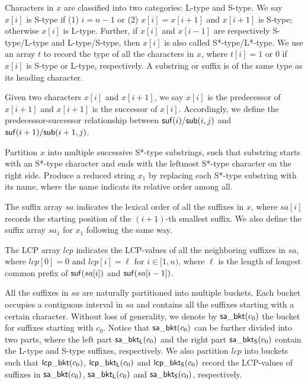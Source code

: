 \documentclass[10pt,journal,compsoc]{IEEEtran}
\begin{document}
Characters in $x$ are classified into two categories: L-type and S-type. We say $x[i]$ is S-type if (1) $i = n - 1$ or (2) $x[i] = x[i + 1]$ and $x[i + 1]$ is S-type; otherwise $x[i]$ is L-type. Further, if $x[i]$ and $x[i - 1]$ are respectively S-type/L-type and L-type/S-type, then $x[i]$ is also called S*-type/L*-type. We use an array $t$ to record the type of all the characters in $x$, where $t[i] = 1$ or $0$ if $x[i]$ is S-type or L-type, respectively. A substring or suffix is of the same type as its heading character. 

Given two characters $x[i]$ and $x[i + 1]$, we say $x[i]$ is the predecessor of $x[i + 1]$ and $x[i + 1]$ is the successor of $x[i]$. Accordingly, we define the predecessor-successor relationship between ${\sf suf}(i)/{\sf sub}(i, j)$ and ${\sf suf}(i + 1)/{\sf sub}(i + 1, j)$.

Partition $x$ into multiple successive S*-type substrings, such that substring starts with an S*-type character and ends with the leftmost S*-type character on the right side. Produce a reduced string $x_1$ by replacing each S*-type substring with its name, where the name indicats its relative order among all.

The suffix array $sa$ indicates the lexical order of all the suffixes in $x$, where $sa[i]$ records the starting position of the $(i + 1)$-th smallest suffix. We also define the suffix array $sa_1$ for $x_1$ following the same way.

The LCP array $lcp$ indicates the LCP-values of all the neighboring suffixes in $sa$, where $lcp[0] = 0$ and $lcp[i] = \ell$ for $i \in [1, n)$, where $\ell$ is the length of longest common prefix of ${\sf suf}(sa[i])$ and ${\sf suf}(sa[i - 1])$.

All the suffixes in $sa$ are naturally partitioned into multiple buckets. Each bucket occupies a contiguous interval in $sa$ and contains all the suffixes starting with a certain character. Without loss of generality, we denote by ${\sf sa\_bkt}(c_0)$ the bucket for suffixes starting with $c_0$. Notice that ${\sf sa\_bkt}(c_0)$ can be further divided into two parts, where the left part ${\sf sa\_bkt_L}(c_0)$ and the right part ${\sf sa\_bkt_S}(c_0)$ contain the L-type and S-type suffixes, respectively. We also partition $lcp$ into buckets such that ${\sf lcp\_bkt}(c_0)$, ${\sf lcp\_bkt_L}(c_0)$ and ${\sf lcp\_bkt_S}(c_0)$ record the LCP-values of suffixes in ${\sf sa\_bkt}(c_0)$, ${\sf sa\_bkt_L}(c_0)$ and ${\sf sa\_bkt_S}(c_0)$, respectively.
\end{document}
